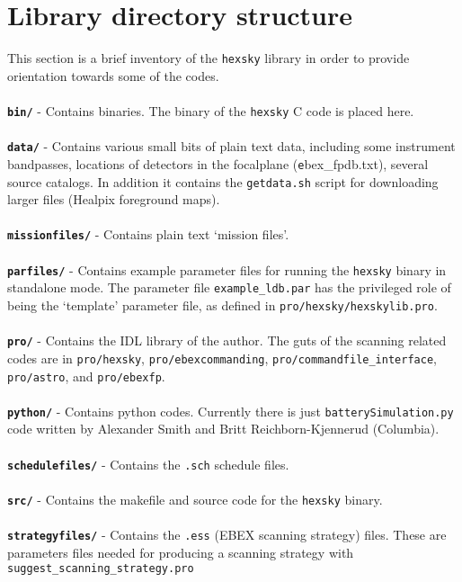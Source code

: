 \documentclass[a4paper,10pt]{article}
\begin{document}
\section{Library directory structure}

This section is a brief inventory of the \texttt{hexsky} library
in order to provide orientation towards some of the codes.
\\
\\
{\bf \texttt{bin/}} - Contains binaries. The binary of the \texttt{hexsky} C
code is placed here.
\\
\\
{\bf \texttt{data/}} - Contains various small bits of plain text data,
including some instrument bandpasses, locations of detectors in the
focalplane ({\texttt ebex\_fpdb.txt}), several source catalogs. In
addition it contains the \texttt{getdata.sh} script for downloading
larger files (Healpix foreground maps).
\\
\\
{\bf \texttt{missionfiles/}} - Contains plain text `mission files'.
\\
\\
{\bf \texttt{parfiles/}} - Contains example parameter files for running the
\texttt{hexsky} binary in standalone mode. The parameter file \texttt{example\_ldb.par}
has the privileged role of being the `template' parameter file, as defined in
\texttt{pro/hexsky/hexskylib.pro}.
\\
\\
{\bf \texttt{pro/}} - Contains the IDL library of the author. The guts of the scanning related
codes are in \texttt{pro/hexsky}, \texttt{pro/ebexcommanding}, \texttt{pro/commandfile\_interface},
\texttt{pro/astro}, and \texttt{pro/ebexfp}.  
\\
\\
{\bf \texttt{python/}} - Contains python codes. Currently there is just \texttt{batterySimulation.py}
code written by Alexander Smith and Britt Reichborn-Kjennerud (Columbia).
\\
\\
{\bf \texttt{schedulefiles/}} - Contains the \texttt{.sch} schedule files.
\\
\\
{\bf \texttt{src/}} - Contains the makefile and source code for the \texttt{hexsky} binary.
\\
\\
{\bf \texttt{strategyfiles/}} - Contains the \texttt{.ess} (EBEX
scanning strategy) files. These are parameters files needed for producing a
scanning strategy with \texttt{suggest\_scanning\_strategy.pro}
\end{document}

